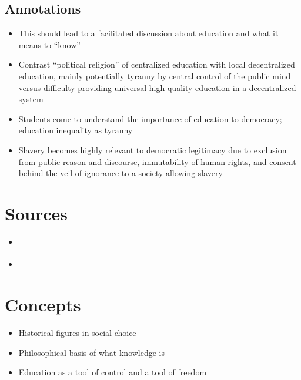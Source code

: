 \subsection{Annotations}

\begin{itemize}
    \item This should lead to a facilitated discussion about education and what it means to ``know''

    \item Contrast ``political religion'' of centralized education with local decentralized education, mainly potentially tyranny by central control of the public mind versus difficulty providing universal high-quality education in a decentralized system

    \item Students come to understand the importance of education to democracy; education inequality as tyranny

    \item Slavery becomes highly relevant to democratic legitimacy due to exclusion from public reason and discourse, immutability of human rights, and consent behind the veil of ignorance to a society allowing slavery
\end{itemize}

\section{Sources}

\begin{itemize}
    \item \autocite[Chapter 2]{Heckelman2015}
    \item \autocite{Yastrebtseva2015}
\end{itemize}

\section{Concepts}

\begin{itemize}
    \item Historical figures in social choice

    \item Philosophical basis of what knowledge is

    \item Education as a tool of control and a tool of freedom
\end{itemize}

